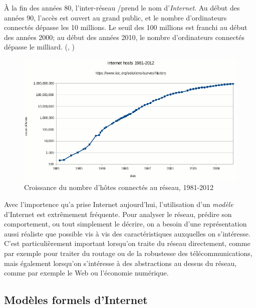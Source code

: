 À la fin des années 80, l'inter-réseau \tcp/\ip prend le nom d'{\em Internet}.
Au début des années 90, l'accès est ouvert au grand public, et le nombre
d'ordinateurs connectés dépasse les 10 millions. Le seuil des 100 millions est
franchi au début des années 2000; au début des années 2010, le nombre
d'ordinateurs connectés dépasse le milliard. 
(, \cite{isc-report})


\begin{figure}[!ht]
\centering
\includegraphics[width=\columnwidth]{images/inet-hosts-growth}
\caption{Croissance du nombre d'hôtes connectés au réseau,
1981-2012\cite{isc-report}}
\label{fig:inet-hosts-growth}
\end{figure}


Avec l'importence qu'a prise Internet aujourd'hui, l'utilisation d'un {\em
modèle} d'Internet est extrêmement fréquente. Pour analyser le réseau, prédire
son comportement, ou tout simplement le décrire, on a besoin d'une
représentation aussi réaliste que possible vis à vis des caractéristiques
auxquelles on s'intéresse. C'est particulièrement important lorsqu'on traite du
réseau directement, comme par exemple pour traiter du routage ou de la
robustesse des télécommunications, mais également lorsqu'on s'intéresse à des
abstractions au dessus du réseau, comme par exemple le Web ou l'économie
numérique.

\subsection{Modèles formels d'Internet}
\label{subsec:intro-models}

